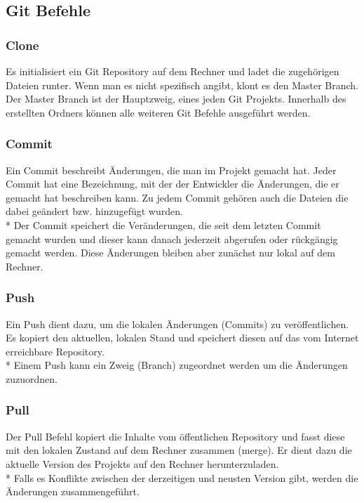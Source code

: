 \subsection{Git Befehle}

\subsubsection{Clone}
\label{sec:Clone}
Es initialisiert ein Git Repository auf dem Rechner und ladet die zugehörigen Dateien runter.
Wenn man es nicht spezifisch angibt, klont es den Master Branch. Der Master Branch ist der Hauptzweig, eines jeden Git Projekts.
Innerhalb des erstellten Ordners können alle weiteren Git Befehle ausgeführt werden. \cite{GitCmnds}
\subsubsection{Commit}
\label{sec:Commit}
Ein Commit beschreibt Änderungen, die man im Projekt gemacht hat. Jeder Commit hat eine Bezeichnung, mit der der Entwickler die Änderungen,
die er gemacht hat beschreiben kann. Zu jedem Commit gehören auch die Dateien die dabei geändert bzw. hinzugefügt wurden.
\\* Der Commit speichert die Veränderungen, die seit dem letzten Commit gemacht wurden und dieser kann danach jederzeit abgerufen oder rückgängig gemacht werden.
Diese Änderungen bleiben aber zunächst nur lokal auf dem Rechner. \cite{GitCmnds}

\subsubsection{Push}
\label{sec:Push}

Ein Push dient dazu, um die lokalen Änderungen (Commits) zu veröffentlichen. Es kopiert den aktuellen, lokalen Stand und speichert diesen auf 
das vom Internet erreichbare Repository. \\* Einem Push kann ein Zweig (Branch) zugeordnet werden um die Änderungen zuzuordnen.
 \cite{GitCmnds}

\subsubsection{Pull}
\label{sec:Pull}
Der Pull Befehl kopiert die Inhalte vom öffentlichen Repository und fasst diese mit den lokalen Zustand auf dem 
Rechner zusammen (merge). Er dient dazu die aktuelle Version des Projekts auf den Rechner herunterzuladen.
\\* Falls es Konflikte zwischen der derzeitigen und neusten Version gibt, werden die Änderungen zusammengeführt. \cite{GitCmnds}

